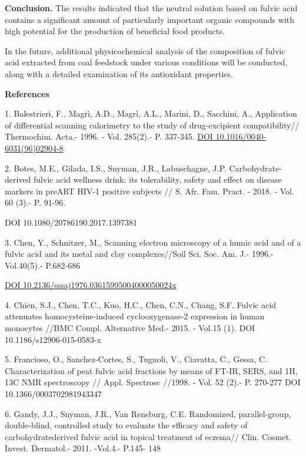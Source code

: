 \begin{multicols}{2}
{\bfseries Conclusion.} The results indicated that the neutral solution
based on fulvic acid contains a significant amount of particularly
important organic compounds with high potential for the production of
beneficial food products.

In the future, additional physicochemical analysis of the composition of
fulvic acid extracted from coal feedstock under various conditions will
be conducted, along with a detailed examination of its antioxidant
properties.
\end{multicols}

\begin{center}
{\bfseries References}
\end{center}

\begin{references}
1. Balestrieri, F., Magrì, A.D., Magrì, A.L., Marini, D., Sacchini, A.,
Application of differential scanning calorimetry to the study of
drug-excipient compatibility// Thermochim. Acta.- 1996. - Vol. 285(2).-
P. 337-345. \href{https://doi.org/10.1016/0040-6031(96)02904-8}{DOI
10.1016/0040-6031(96)02904-8}

2. Botes, M.E., Gilada, I.S., Snyman, J.R., Labuschagne, J.P.
Carbohydrate-derived fulvic acid wellness drink: its tolerability,
safety and effect on disease markers in preART HIV-1 positive subjects
// S. Afr. Fam. Pract. - 2018. - Vol. 60 (3).- P. 91-96.

DOI 10.1080/20786190.2017.1397381

3. Chen, Y., Schnitzer, M., Scanning electron microscopy of a humic acid
and of a fulvic acid and its metal and clay complexes//Soil Sci. Soc.
Am. J.- 1996.-Vol.40(5).- P.682-686

\href{https://doi.org/10.2136/sssaj1976.03615995004000050024x}{DOI
10.2136/sssaj1976.03615995004000050024x}

4. Chien, S.J., Chen, T.C., Kuo, H.C., Chen, C.N., Chang, S.F. Fulvic
acid attenuates homocysteine-induced cyclooxygenase-2 expression in
human monocytes //BMC Compl. Alternative Med.- 2015. - Vol.15 (1). DOI
10.1186/s12906-015-0583-x

5. Francioso, O., Sanchez-Cortes, S., Tugnoli, V., Ciavatta, C., Gessa,
C. Characterization of peat fulvic acid fractions by means of FT-IR,
SERS, and 1H, 13C NMR spectroscopy // Appl. Spectrosc //1998. - Vol. 52
(2).- P. 270-277 DOI 10.1366/0003702981943347

6. Gandy, J.J., Snyman, J.R., Van Rensburg, C.E. Randomized,
parallel-group, double-blind, controlled study to evaluate the efficacy
and safety of carbohydratederived fulvic acid in topical treatment of
eczema// Clin. Cosmet. Invest. Dermatol.- 2011. -Vol.4.- P.145- 148


\end{references}
